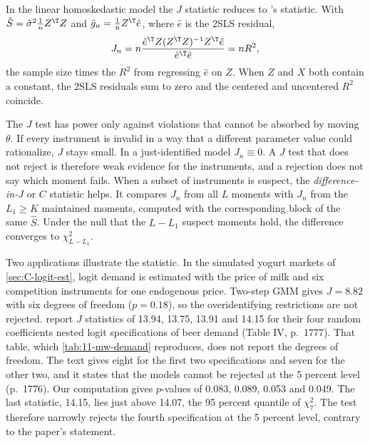 In the linear homoskedastic model the $J$ statistic reduces to \citet{Sargan1958}'s statistic. With
$\hat S = \hat\sigma^2\frac{1}{n}Z^\T Z$ and $\bar g_n = \frac{1}{n}Z^\T\hat e$, where $\hat e$ is the 2SLS residual,
\begin{equation*}
  J_n = n\frac{\hat e^\T Z(Z^\T Z)^{-1}Z^\T\hat e}{\hat e^\T\hat e} = nR^2,
\end{equation*}
the sample size times the $R^2$ from regressing $\hat e$ on $Z$. When $Z$ and $X$ both contain a constant, the 2SLS residuals
sum to zero and the centered and uncentered $R^2$ coincide.

The $J$ test has power only against violations that cannot be absorbed by moving $\theta$. If every instrument is
invalid in a way that a different parameter value could rationalize, $J$ stays small. In a just-identified model
$J_n \equiv 0$. A $J$ test that does not reject is therefore weak evidence for the instruments, and a rejection does not say
which moment fails. When a subset of instruments is suspect, the \emph{difference-in-$J$} or $C$ statistic helps. It
compares $J_n$ from all $L$ moments with $J_n$ from the $L_1 \ge K$ maintained moments, computed with the corresponding
block of the same $\hat S$. Under the null that the $L - L_1$ suspect moments hold, the difference converges to $\chi^2_{L - L_1}$.

Two applications illustrate the statistic. In the simulated yogurt markets of \cref{sec:C-logit-est}, logit demand is
estimated with the price of milk and six competition instruments for one endogenous price. Two-step GMM gives
$J = 8.82$ with six degrees of freedom ($p = 0.18$), so the overidentifying restrictions are not rejected.
\citet{MillerWeinberg2017} report $J$ statistics of 13.94, 13.75, 13.91 and 14.15 for their four random coefficients nested
logit specifications of beer demand (Table IV, p.~1777). That table, which \cref{tab:11-mw-demand} reproduces, does not
report the degrees of freedom. The text gives eight for the first two specifications and seven for the other two, and it
states that the models cannot be rejected at the 5 percent level (p.~1776). Our computation gives $p$-values of 0.083,
0.089, 0.053 and 0.049. The last statistic, 14.15, lies just above 14.07, the 95 percent quantile of $\chi^2_7$.
The test therefore narrowly rejects the fourth specification at the 5 percent level, contrary to the paper's statement.

